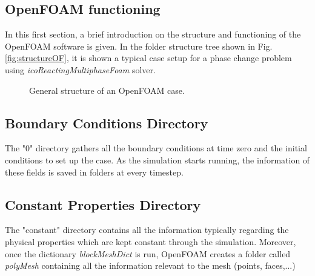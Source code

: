 \subsection{OpenFOAM functioning}
In this first section, a brief introduction on the structure and functioning of the OpenFOAM software is given.
In the folder structure tree shown in Fig. \ref{fig:structureOF}, it is shown a typical case setup for a phase change problem using \textit{icoReactingMultiphaseFoam} solver.
\clearpage
\begin{figure}[h!]
	\centering
	\label{3.1fig}
	\caption{General structure of an OpenFOAM case.}
\end{figure}

\subsection{Boundary Conditions Directory}
The "0" directory gathers all the boundary conditions at time zero and the initial conditions to set up the case. As the simulation starts running, the information of these fields is saved in folders at every timestep.
\subsection{Constant Properties Directory}
The "constant" directory contains all the information typically regarding the physical properties which are kept constant through the simulation. Moreover, once the dictionary \textit{blockMeshDict} is run, OpenFOAM creates a folder called \textit{polyMesh} containing all the information relevant to the mesh (points, faces,...) 
